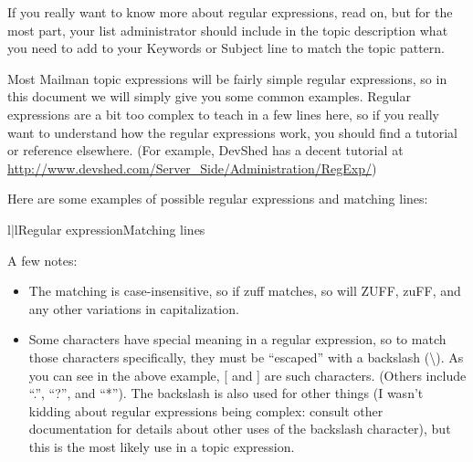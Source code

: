 \documentclass{howto}
\begin{document}
If you really want to know more about regular expressions, read on, but for the
most part, your list administrator should include in the topic description what
you need to add to your Keywords or Subject line to match the topic pattern.

Most Mailman topic expressions will be fairly simple regular expressions, so 
in this document we will simply give you some common examples.  Regular 
expressions are a bit too complex to teach in a few lines here, so if you
really want to understand how the regular expressions work, you should
find a tutorial or reference elsewhere.  (For example, DevShed has a decent
tutorial at 
\url{http://www.devshed.com/Server_Side/Administration/RegExp/})  

Here are some examples of possible regular expressions and matching lines:

\begin{tableii}{l|l}{}{Regular expression}{Matching lines}
\hline
\end{tableii}

A few notes:
\begin{itemize}
	\item The matching is case-insensitive, so if zuff matches, so will ZUFF,
	 zuFF, and any other variations in capitalization.
	\item Some characters have special meaning in a regular expression, so
	to match those characters specifically, they must be ``escaped'' with a 
	backslash (\textbackslash).  As you can see in the above example, 
	[ and ] are such characters.  (Others include ``.'', ``?'', and ``*'').  
	The backslash is also used for other things (I wasn't kidding about 
	regular expressions being complex: consult other documentation
	for details about other uses of the backslash character), but this 
	is the most likely use in a topic expression.
\end{itemize}

\end{document}
